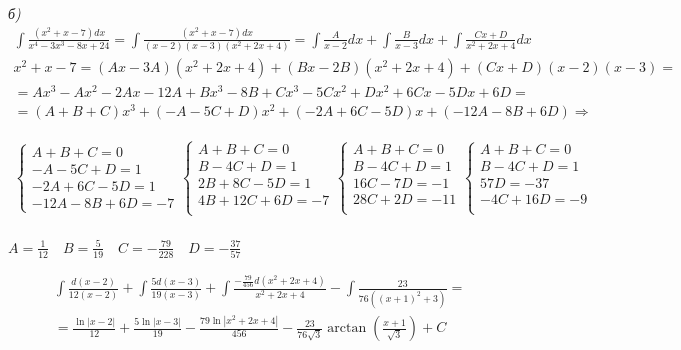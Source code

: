 \documentclass[a4paper,11pt]{article}
\begin{document}
\noindent \textsl{б) }
\begin{gather*}
	\int \frac{(x^2 + x - 7)dx}{x^4 - 3x^3 - 8x + 24} = \int \frac{(x^2 + x - 7)dx}{(x - 2)(x - 3)(x^2 + 2x + 4)} = \int \frac{A}{x - 2}dx + \int \frac{B}{x - 3}dx + \int \frac{Cx + D}{x^2 + 2x + 4}dx \\[2pt]
	x^2 + x - 7 =  (Ax - 3A)(x^2 + 2x + 4) + (Bx - 2B)(x^2 + 2x + 4) + (Cx + D)(x - 2)(x - 3) = \\[2pt]
	= Ax^3 - Ax^2 - 2Ax - 12A + Bx^3 - 8B + Cx^3 - 5Cx^2 + Dx^2 + 6Cx - 5Dx + 6D = \\[2pt]
	= (A + B + C)x^3 + (-A - 5C + D)x^2 + (-2A + 6C - 5D)x + (-12A - 8B + 6D) \Rightarrow
\end{gather*}

\begin{gather*}
\begin{cases}
A + B + C = 0 \\
- A - 5C + D = 1 \\
-2A + 6C - 5D = 1 \\
-12A - 8B + 6D = -7
\end{cases}
\begin{cases}
A + B + C = 0 \\
B - 4C + D = 1 \\
2B + 8C - 5D = 1 \\
4B + 12C + 6D = -7 \\
\end{cases}
\begin{cases}
A + B + C = 0 \\
B - 4C + D = 1 \\
16C - 7D = -1 \\
28C +2D = -11 \\
\end{cases}
\begin{cases}
A + B + C = 0 \\
B - 4C + D = 1 \\
57D = -37 \\
-4C +16D = -9 \\
\end{cases}
\end{gather*} \\
$ A =  \frac1{12} \quad B =  \frac{5}{19} \quad C =  -\frac{79}{228} \quad D = -\frac{37}{57} $

\begin{gather*}
	\int \frac{d(x - 2)}{12(x - 2)} + \int \frac{5d(x - 3)}{19(x - 3)} + \int \frac{-\frac{79}{456}d(x^2 + 2x + 4 )}{x^2 + 2x + 4 } - \int \frac{23}{76((x + 1)^2 + 3)} = \\[2pt]
	= \frac{\ln |x - 2|}{12} + \frac{5\ln |x - 3|}{19} - \frac{79\ln |x^2 + 2x + 4|}{456} - \frac{23}{76\sqrt{3}} \arctan (\frac{x + 1}{\sqrt{3}}) + C
\end{gather*}
\end{document}

